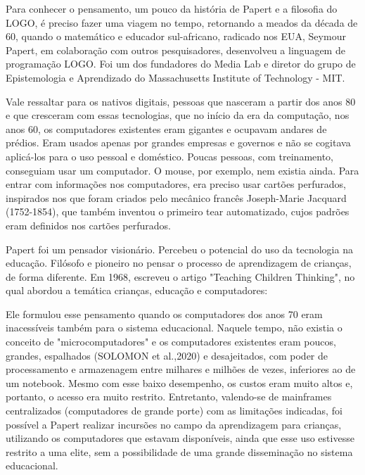 Para conhecer  o pensamento, um pouco da história de Papert e  a filosofia do LOGO, é preciso fazer uma viagem no tempo, retornando a meados da década de 60, quando o matemático e educador sul-africano, radicado nos EUA, Seymour Papert, em colaboração com outros pesquisadores, desenvolveu a linguagem  de programação LOGO.  Foi um dos fundadores do Media Lab e diretor do grupo de Epistemologia e Aprendizado do Massachusetts Institute of Technology - MIT.

Vale ressaltar para os nativos digitais, pessoas que nasceram a partir dos anos 80 e que cresceram com essas tecnologias, que no início da era da computação, nos anos 60, os computadores existentes eram gigantes e ocupavam andares de prédios. Eram usados apenas por grandes empresas e governos e não se cogitava aplicá-los para o uso pessoal e doméstico. Poucas pessoas, com treinamento, conseguiam usar um computador. O mouse, por exemplo, nem existia ainda. Para entrar com informações nos computadores, era preciso usar cartões perfurados, inspirados nos que foram criados pelo mecânico francês Joseph-Marie Jacquard (1752-1854), que também inventou o primeiro tear automatizado, cujos padrões eram definidos nos cartões perfurados.

Papert foi um pensador visionário. Percebeu o potencial do uso da tecnologia na educação. Filósofo e pioneiro no pensar o processo de aprendizagem de crianças, de forma diferente. Em 1968, escreveu o artigo "Teaching Children Thinking", no qual abordou a temática crianças, educação e computadores:


\noindent\begin{flushright}\mbox{\linespread{1}\selectfont\centering{}}\end{flushright}


Ele formulou esse pensamento quando os computadores dos anos 70 eram inacessíveis também para o sistema educacional. Naquele tempo, não existia o conceito de "microcomputadores" e os computadores existentes eram poucos, grandes, espalhados  (SOLOMON et al.,2020) e desajeitados, com poder de processamento e armazenagem entre milhares e milhões de vezes, inferiores ao de um notebook. Mesmo com esse baixo desempenho, os custos eram muito altos e, portanto, o acesso era muito restrito. Entretanto, valendo-se de mainframes centralizados (computadores de grande porte) com as limitações indicadas, foi possível a Papert realizar incursões no campo da aprendizagem para crianças, utilizando os computadores que estavam disponíveis, ainda que esse uso estivesse restrito a uma elite, sem a possibilidade de uma grande disseminação no sistema educacional.

